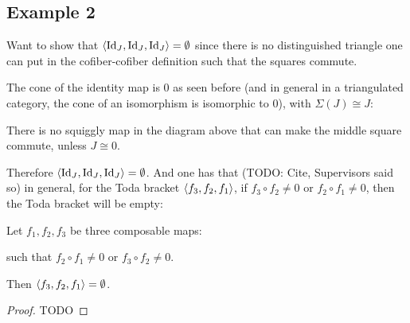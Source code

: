 \subsection{Example 2}

Want to show that \( \langle \operatorname{Id}_J, \operatorname{Id}_J, \operatorname{Id}_J \rangle = \emptyset \) since there is no distinguished triangle one can put in the cofiber-cofiber definition such that the squares commute.

The cone of the identity map is \( 0 \) as seen before (and in general in a triangulated category, the cone of an isomorphism is isomorphic to \( 0 \)), with \( \Sigma(J) \cong J \):

\begin{center}
\end{center}

There is no squiggly map in the diagram above that can make the middle square commute, unless \( J \cong 0 \).

Therefore \( \langle \operatorname{Id}_J, \operatorname{Id}_J, \operatorname{Id}_J \rangle = \emptyset \). And one has that (TODO: Cite, Supervisors said so) in general, for the Toda bracket \( \langle f_3, f_2, f_1 \rangle \), if \( f_3 \circ f_2 \neq 0 \) or \( f_2 \circ f_1 \neq 0 \), then the Toda bracket will be empty:

\begin{theorem}
	Let \( f_1, f_2, f_3 \) be three composable maps:

	\begin{center}
	\end{center}

	such that \( f_2 \circ f_1 \neq 0 \) or \( f_3 \circ f_2 \neq 0 \).

	Then \( \langle f_3, f_2, f_1 \rangle = \emptyset \).
\end{theorem}
\begin{proof}
	TODO
\end{proof}

